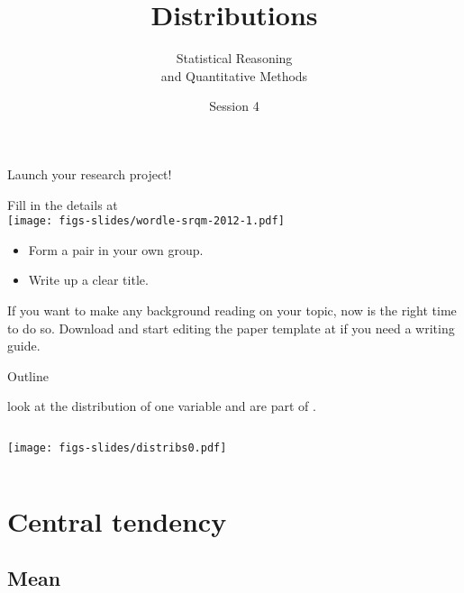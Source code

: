 \documentclass{beamer}
\author{Statistical Reasoning\\and Quantitative Methods}
\title{Distributions}
\institute{François Briatte \& Ivaylo Petev}
\date{Session 4}
\begin{document}
		
	\begin{frame}[t,plain]
		\titlepage
	\end{frame}
	
	\begin{frame}[t]{Launch your research project!}
	
		Fill in the details at \\[1em]
		
		\texttt{[image: figs-slides/wordle-srqm-2012-1.pdf]}
	
		\begin{itemize}
			\item Form a pair in your own group.
			\item Write up a clear title.
		\end{itemize}
	
		If you want to make any background reading on your topic, now is the right time to do so. Download and start editing the paper template at  if you need a writing guide.

	\end{frame}
	
	\begin{frame}[t]{Outline}
	
	 look at the distribution of one variable and are part of .
	
		\begin{columns}[T]
			\tableofcontents[hideallsubsections]
			\begin{center}
				\texttt{[image: figs-slides/distribs0.pdf]}
			\end{center}		
		\end{columns}
	\end{frame}
	

	\section{Central tendency}

	\subsection{Mean}
	
\end{document}
